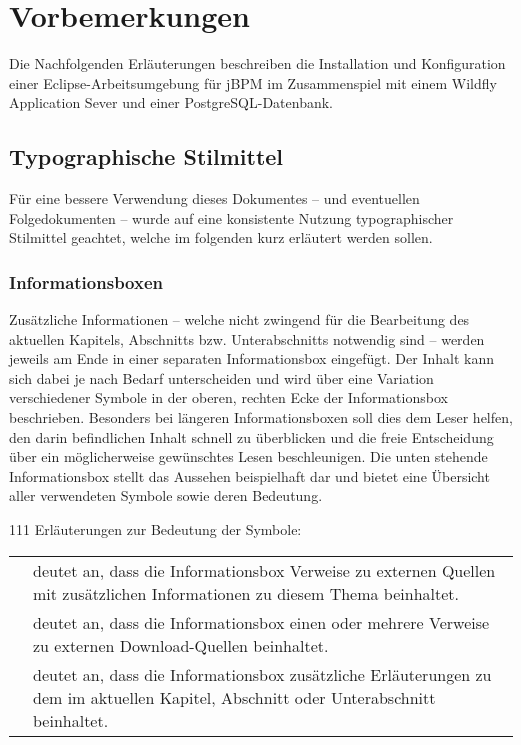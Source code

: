 \section{Vorbemerkungen}
Die Nachfolgenden Erläuterungen beschreiben die Installation und Konfiguration einer Eclipse-Arbeitsumgebung für jBPM im Zusammenspiel mit einem Wildfly Application Sever und einer PostgreSQL-Datenbank.

\subsection{Typographische Stilmittel}
Für eine bessere Verwendung dieses Dokumentes -- und eventuellen Folgedokumenten -- wurde auf eine konsistente Nutzung typographischer Stilmittel geachtet, welche im folgenden kurz erläutert werden sollen.

\subsubsection{Informationsboxen}
Zusätzliche Informationen -- welche nicht zwingend für die Bearbeitung des aktuellen Kapitels, Abschnitts bzw. Unterabschnitts notwendig sind -- werden jeweils am Ende in einer separaten Informationsbox eingefügt. Der Inhalt kann sich dabei je nach Bedarf unterscheiden und wird über eine Variation verschiedener Symbole in der oberen, rechten Ecke der Informationsbox beschrieben. Besonders bei längeren Informationsboxen soll dies dem Leser helfen, den darin befindlichen Inhalt schnell zu überblicken und die freie Entscheidung über ein möglicherweise gewünschtes Lesen beschleunigen. Die unten stehende Informationsbox stellt das Aussehen beispielhaft dar und bietet eine Übersicht aller verwendeten Symbole sowie deren Bedeutung.
\begin{info}{111}
	Erläuterungen zur Bedeutung der Symbole:\\[1em]
	\begin{tabular}{m{2em}m{}}
	\bookmarkicon	& deutet an, dass die Informationsbox Verweise zu externen Quellen mit zusätzlichen Informationen zu diesem Thema beinhaltet. \\[0.5em] 
	\downloadicon	& deutet an, dass die Informationsbox einen oder mehrere Verweise zu externen Download-Quellen beinhaltet. \\[0.5em]
	\fileicon	& deutet an, dass die Informationsbox zusätzliche Erläuterungen zu dem im aktuellen Kapitel, Abschnitt oder Unterabschnitt beinhaltet.
	\end{tabular}
\end{info}
